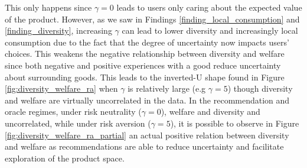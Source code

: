 \documentclass[sigconf]{acmart}
\begin{document}
This only happens since $\gamma = 0$ leads to users only caring about the expected value of the product. However, as we saw in Findings \ref{finding_local_consumption} and \ref{finding_diversity}, increasing $\gamma$ can lead to lower diversity and increasingly local consumption due to the fact that the degree of uncertainty now impacts users' choices. This weakens the negative relationship between diversity and welfare since both negative and positive experiences with a good reduce uncertainty about surrounding goods. This leads to the inverted-U shape found in Figure \ref{fig:diversity_welfare_ra} when $\gamma$ is relatively large (e.g $\gamma = 5$) though diversity and welfare are virtually uncorrelated in the data. In the recommendation and oracle regimes, under risk neutrality ($\gamma=0$), welfare and diversity and uncorrelated, while under risk aversion ($\gamma=5$), it is possible to observe in Figure \ref{fig:diversity_welfare_ra_partial} an actual positive relation between diversity and welfare as recommendations are able to reduce uncertainty and facilitate exploration of the product space.
\par
\end{document}
